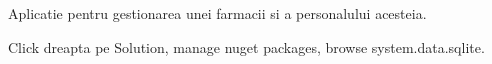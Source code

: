 Aplicatie pentru gestionarea unei farmacii si a personalului acesteia.

Click dreapta pe Solution, manage nuget packages, browse system.\+data.\+sqlite. 